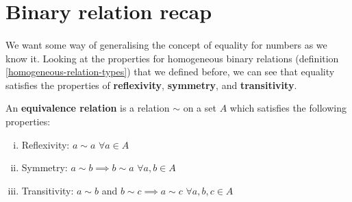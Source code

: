 \documentclass[../abstract_algebra.tex]{subfiles}
\begin{document}
    \section{Binary relation recap}
        \paragraph{}
        We want some way of generalising the concept of equality for numbers as we know it.
        Looking at the properties for homogeneous binary relations (definition \ref{homogeneous-relation-types}) that we defined before, we can see that equality satisfies the properties of \textbf{reflexivity}, \textbf{symmetry}, and \textbf{transitivity}.
        \begin{definition}
            An \textbf{equivalence relation} is a relation $\sim $ on a set $A$ which satisfies the following properties:
            \begin{enumerate}[(i)]
                \item Reflexivity: $a\sim a$ $\forall a\in A$
                \item Symmetry: $a\sim b\implies b\sim a$ $\forall a,b\in A$
                \item Transitivity: $a\sim b$ and $b\sim c\implies a\sim c$ $\forall a,b,c\in A$
            \end{enumerate}
        \end{definition}
        
\end{document}
